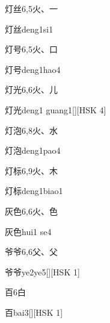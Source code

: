 \begin{entry}{灯丝}{6,5}{⽕、⼀}
  \begin{phonetics}{灯丝}{deng1si1}
  \end{phonetics}
\end{entry}

\begin{entry}{灯号}{6,5}{⽕、⼝}
  \begin{phonetics}{灯号}{deng1hao4}
  \end{phonetics}
\end{entry}

\begin{entry}{灯光}{6,6}{⽕、⼉}
  \begin{phonetics}{灯光}{deng1 guang1}[][HSK 4]
  \end{phonetics}
\end{entry}

\begin{entry}{灯泡}{6,8}{⽕、⽔}
  \begin{phonetics}{灯泡}{deng1pao4}
  \end{phonetics}
\end{entry}

\begin{entry}{灯标}{6,9}{⽕、⽊}
  \begin{phonetics}{灯标}{deng1biao1}
  \end{phonetics}
\end{entry}

\begin{entry}{灰色}{6,6}{⽕、⾊}
  \begin{phonetics}{灰色}{hui1 se4}
  \end{phonetics}
\end{entry}

\begin{entry}{爷爷}{6,6}{⽗、⽗}
  \begin{phonetics}{爷爷}{ye2ye5}[][HSK 1]
  \end{phonetics}
\end{entry}

\begin{entry}{百}{6}{⽩}
  \begin{phonetics}{百}{bai3}[][HSK 1]
  \end{phonetics}
\end{entry}

